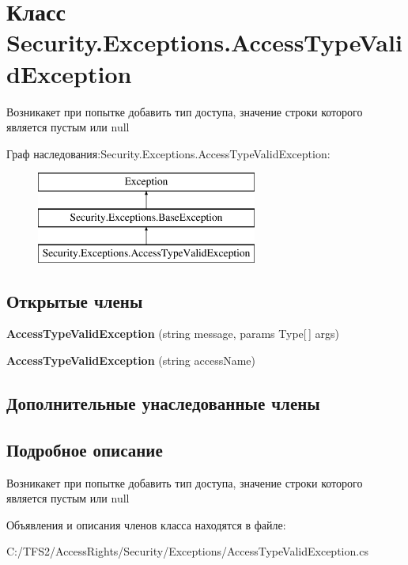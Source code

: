 \hypertarget{class_security_1_1_exceptions_1_1_access_type_valid_exception}{}\section{Класс Security.\+Exceptions.\+Access\+Type\+Valid\+Exception}
\label{class_security_1_1_exceptions_1_1_access_type_valid_exception}


Возникакет при попытке добавить тип доступа, значение строки которого является пустым или null  


Граф наследования\+:Security.\+Exceptions.\+Access\+Type\+Valid\+Exception\+:\begin{figure}[H]
\begin{center}
\leavevmode
\includegraphics[height=3.000000cm]{df/d81/class_security_1_1_exceptions_1_1_access_type_valid_exception}
\end{center}
\end{figure}
\subsection*{Открытые члены}
\begin{DoxyCompactItemize}
\item 
\mbox{\label{class_security_1_1_exceptions_1_1_access_type_valid_exception_ab3d609f4c390b7a105e994c9d622a889}} 
{\bfseries Access\+Type\+Valid\+Exception} (string message, params Type\mbox{[}$\,$\mbox{]} args)
\item 
\mbox{\label{class_security_1_1_exceptions_1_1_access_type_valid_exception_a0128e9f331b56899904a381ec93f41d3}} 
{\bfseries Access\+Type\+Valid\+Exception} (string access\+Name)
\end{DoxyCompactItemize}
\subsection*{Дополнительные унаследованные члены}


\subsection{Подробное описание}
Возникакет при попытке добавить тип доступа, значение строки которого является пустым или null 



Объявления и описания членов класса находятся в файле\+:\begin{DoxyCompactItemize}
\item 
C\+:/\+T\+F\+S2/\+Access\+Rights/\+Security/\+Exceptions/Access\+Type\+Valid\+Exception.\+cs\end{DoxyCompactItemize}
